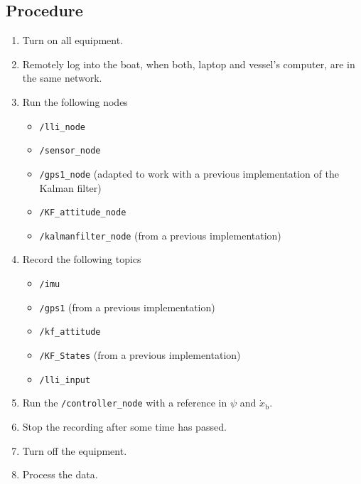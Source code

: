 \subsection*{Procedure}
\begin{enumerate}
    \item Turn on all equipment.
    \item Remotely log into the boat, when both, laptop and vessel's computer, are in the same network.
    \item Run the following nodes
    \begin{itemize}
        \item \lstinline[style=cinline]{/lli_node}
        \item \lstinline[style=cinline]{/sensor_node}
        \item \lstinline[style=cinline]{/gps1_node} (adapted to work with a previous implementation of the Kalman filter)
        \item \lstinline[style=cinline]{/KF_attitude_node}
        \item \lstinline[style=cinline]{/kalmanfilter_node} (from a previous implementation)
    \end{itemize}
    \item Record the following topics
    \begin{itemize}
        \item \lstinline[style=cinline]{/imu}   
        \item \lstinline[style=cinline]{/gps1} (from a previous implementation)
        \item \lstinline[style=cinline]{/kf_attitude}
        \item \lstinline[style=cinline]{/KF_States} (from a previous implementation)  
        \item \lstinline[style=cinline]{/lli_input}  
    \end{itemize}
    \item Run the \lstinline[style=cinline]{/controller_node} with a reference in $\psi$ and $\dot{x}_\mathrm{b}$.
    \item Stop the recording after some time has passed.
    \item Turn off the equipment.
    \item Process the data.
\end{enumerate}

